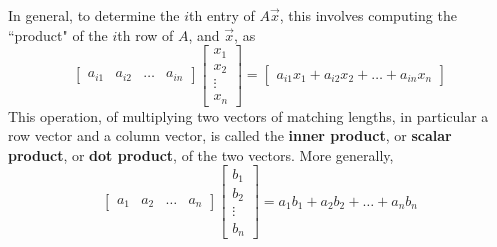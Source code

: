 \documentclass[letterpaper,12pt]{article}
\begin{document}
In general, to determine the $i$th entry of $A\vec{x}$, this involves computing the ``product" of the $i$th row of $A$, and $\vec{x}$, as
\begin{equation*}
    \begin{bmatrix} a_{i1} & a_{i2} & \dots & a_{in} \end{bmatrix} \begin{bmatrix} x_1 \\ x_2 \\ \vdots \\ x_n \end{bmatrix} = \begin{bmatrix} a_{i1} x_1 + a_{i2} x_2 + \dots + a_{in} x_n \end{bmatrix}
\end{equation*}
This operation, of multiplying two vectors of matching lengths, in particular a row vector and a column vector, is called the \textbf{inner product}, or \textbf{scalar product}, or \textbf{dot product}, of the two vectors. More generally,
\begin{equation*}
    \boxed{\begin{bmatrix} a_1 & a_2 & \dots & a_n \end{bmatrix} \begin{bmatrix} b_1 \\ b_2 \\ \vdots \\ b_n \end{bmatrix} = a_1 b_1 + a_2 b_2 + \dots + a_n b_n}
\end{equation*}
\end{document}
